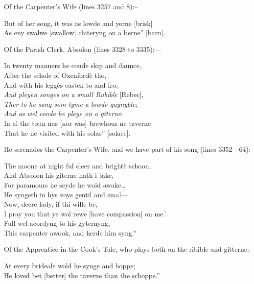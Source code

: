Of the Carpenter’s Wife (lines 3257 and 8):--
\begin{scverse}But of her song, it was as lowde and yerne [brisk]\\
As eny swalwe [swallow] chiteryng on a berne” [barn].
\end{scverse}
Of the Parish Clerk, Absolon (lines 3328 to 3335):—
\begin{scverse}In twenty manners he coude skip and daunce,\\
After the schole of Oxenfordè tho,\\
And with his leggès casten to and fro;\\
\textit{And pleyen songes on a small Rubible} [Rebec],\\
\textit{Ther-to he sang som tyme a lowde quynyble};\footnotemark\\
\textit{And as wel coude he pleye on a giterne}:\\
In al the toun nas [nor was] brewhous ne taverne\\
That he ne visited with his solas” [solace].
\end{scverse}
He serenades the Carpenter’s Wife, and we have part of his song (lines 3352—64):%
\begin{scverse}The moone at night ful cleer and brightè schoon,\\
And Absolon his giterne hath i-take,\\
For paramours he seyde he wold awake\ldots\  \\
He syngeth in hys voys gentil and smal—\\
Now, deere lady, if thi wille be,\\
I pray you that ye wol rewe [have compassion] on me.’\\
Full wel acordyng to his gyternyng,\\
This carpenter awook, and herde him syng.”
\end{scverse}
Of the Apprentice in the Cook’s Tale, who plays both on the ribible and gitterne:
\begin{scverse}At every brideale wold he synge and hoppe;\\
He loved bet [better] the taverne than the schoppe.” 
\end{scverse}


\pagebreak